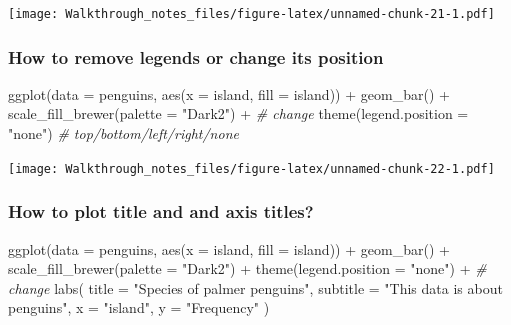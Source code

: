 \documentclass[
]{article}
\newenvironment{Shaded}{\begin{snugshade}}{\end{snugshade}}
\newcommand{\AttributeTok}[1]{\textcolor[rgb]{0.77,0.63,0.00}{#1}}
\newcommand{\CommentTok}[1]{\textcolor[rgb]{0.56,0.35,0.01}{\textit{#1}}}
\newcommand{\FunctionTok}[1]{\textcolor[rgb]{0.00,0.00,0.00}{#1}}
\newcommand{\NormalTok}[1]{#1}
\newcommand{\SpecialCharTok}[1]{\textcolor[rgb]{0.00,0.00,0.00}{#1}}
\newcommand{\StringTok}[1]{\textcolor[rgb]{0.31,0.60,0.02}{#1}}
\begin{document}
\texttt{[image: Walkthrough\_notes\_files/figure-latex/unnamed-chunk-21-1.pdf]}

\hypertarget{how-to-remove-legends-or-change-its-position}{%
\subsubsection{How to remove legends or change its
position}\label{how-to-remove-legends-or-change-its-position}}

\begin{Shaded}
\begin{Highlighting}[]
\FunctionTok{ggplot}\NormalTok{(}\AttributeTok{data =}\NormalTok{ penguins, }\FunctionTok{aes}\NormalTok{(}\AttributeTok{x =}\NormalTok{ island, }
                            \AttributeTok{fill =}\NormalTok{ island)) }\SpecialCharTok{+} 
  \FunctionTok{geom\_bar}\NormalTok{() }\SpecialCharTok{+} 
    \FunctionTok{scale\_fill\_brewer}\NormalTok{(}\AttributeTok{palette =} \StringTok{"Dark2"}\NormalTok{) }\SpecialCharTok{+}
\CommentTok{\# change}
\FunctionTok{theme}\NormalTok{(}\AttributeTok{legend.position =} \StringTok{"none"}\NormalTok{) }\CommentTok{\# top/bottom/left/right/none}
\end{Highlighting}
\end{Shaded}

\texttt{[image: Walkthrough\_notes\_files/figure-latex/unnamed-chunk-22-1.pdf]}

\hypertarget{how-to-plot-title-and-and-axis-titles}{%
\subsubsection{How to plot title and and axis
titles?}\label{how-to-plot-title-and-and-axis-titles}}

\begin{Shaded}
\begin{Highlighting}[]
\FunctionTok{ggplot}\NormalTok{(}\AttributeTok{data =}\NormalTok{ penguins, }\FunctionTok{aes}\NormalTok{(}\AttributeTok{x =}\NormalTok{ island, }
                            \AttributeTok{fill =}\NormalTok{ island)) }\SpecialCharTok{+} 
  \FunctionTok{geom\_bar}\NormalTok{() }\SpecialCharTok{+} 
    \FunctionTok{scale\_fill\_brewer}\NormalTok{(}\AttributeTok{palette =} \StringTok{"Dark2"}\NormalTok{) }\SpecialCharTok{+}
  \FunctionTok{theme}\NormalTok{(}\AttributeTok{legend.position =} \StringTok{"none"}\NormalTok{) }\SpecialCharTok{+}
\CommentTok{\# change}
  \FunctionTok{labs}\NormalTok{(}
    \AttributeTok{title =} \StringTok{"Species of palmer penguins"}\NormalTok{, }
    \AttributeTok{subtitle =} \StringTok{"This data is about penguins"}\NormalTok{, }
    \AttributeTok{x =} \StringTok{"island"}\NormalTok{, }
    \AttributeTok{y =} \StringTok{"Frequency"}
\NormalTok{  )}
\end{Highlighting}
\end{Shaded}
\end{document}
